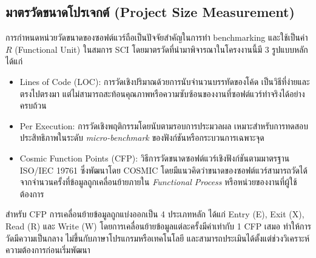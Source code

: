 \subsection{มาตรวัดขนาดโปรเจกต์ (Project Size Measurement)}
การกำหนดหน่วยวัดขนาดของซอฟต์แวร์ถือเป็นปัจจัยสำคัญในการทำ benchmarking และใช้เป็นค่า $R$ (Functional Unit) ในสมการ SCI โดยมาตรวัดที่นำมาพิจารณาในโครงงานนี้มี 3 รูปแบบหลัก ได้แก่~\cite{vanHeeringen2015size}
\begin{itemize}
    \item {\boldfont Lines of Code (LOC)}: การวัดเชิงปริมาณด้วยการนับจำนวนบรรทัดของโค้ด เป็นวิธีที่ง่ายและตรงไปตรงมา แต่ไม่สามารถสะท้อนคุณภาพหรือความซับซ้อนของงานที่ซอฟต์แวร์ทำจริงได้อย่างครบถ้วน
    \item {\boldfont Per Execution}: การวัดเชิงพฤติกรรมโดยนับตามรอบการประมวลผล เหมาะสำหรับการทดสอบประสิทธิภาพในระดับ \textit{micro-benchmark} ของฟังก์ชันหรือกระบวนการเฉพาะจุด
    \item {\boldfont Cosmic Function Points (CFP)}: วิธีการวัดขนาดซอฟต์แวร์เชิงฟังก์ชันตามมาตรฐาน ISO/IEC 19761 ซึ่งพัฒนาโดย COSMIC โดยมีแนวคิดว่าขนาดของซอฟต์แวร์สามารถวัดได้จากจำนวนครั้งที่ข้อมูลถูกเคลื่อนย้ายภายใน \textit{Functional Process} หรือหน่วยของงานที่ผู้ใช้ต้องการ~\cite{abran2018cosmic}
\end{itemize}

สำหรับ CFP การเคลื่อนย้ายข้อมูลถูกแบ่งออกเป็น 4 ประเภทหลัก ได้แก่ Entry (E), Exit (X), Read (R) และ Write (W) โดยการเคลื่อนย้ายข้อมูลแต่ละครั้งมีค่าเท่ากับ 1 CFP เสมอ ทำให้การวัดมีความเป็นกลาง ไม่ขึ้นกับภาษาโปรแกรมหรือเทคโนโลยี และสามารถประเมินได้ตั้งแต่ช่วงวิเคราะห์ความต้องการก่อนเริ่มพัฒนา


